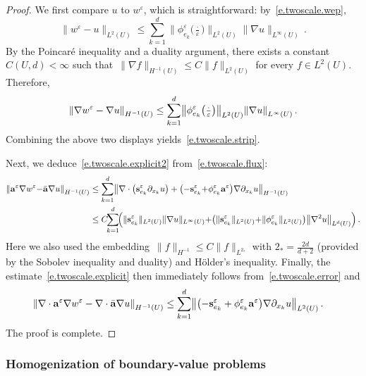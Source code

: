 \documentclass[11pt]{article} %
\numberwithin{equation}{section}
\theoremstyle{definition}
\let\originalleft\left
\let\originalright\right
\renewcommand{\left}{\mathopen{}\mathclose\bgroup\originalleft}
\renewcommand{\right}{\aftergroup\egroup\originalright}
\newcommand{\eps}{\varepsilon}
\newcommand{\s}{\mathbf{s}}
\newcommand{\ep}{\eps}
\renewcommand{\a}{\mathbf{a}}
\newcommand{\ahom}{\bar{\a}}
\begin{document}
\begin{proof}
We first compare $u$ to $w^\ep$, which is straightforward: by~\eqref{e.twoscale.wep}, 
\begin{equation*}
\| w^\ep - u  \|_{L^2(U)} 
\leq
\sum_{k=1}^d  
\| \phi_{e_k}^\ep\bigl( \tfrac \cdot \ep\bigr) \|_{L^2(U)}
\| \nabla u \|_{L^\infty(U)}
\,.
\end{equation*}
By the Poincar\'e inequality and a duality argument, there exists a constant~$C(U,d)<\infty$ such that~$\| \nabla f \|_{H^{-1}(U)} \leq C \| f  \|_{L^2(U)}$ for every $f\in L^2(U)$. Therefore,
\begin{equation*}
\left\| 
\nabla w^\ep - \nabla u \right\|_{H^{-1}(U)} 
\leq
\sum_{k=1}^d  
\left\| \phi_{e_k}^\ep\bigl( \tfrac \cdot \ep\bigr) \right\|_{L^2(U)}
\left\| \nabla u \right\|_{L^\infty(U)}
\,.
\end{equation*}
Combining the above two displays yields~\eqref{e.twoscale.strip}.

\smallskip

Next, we deduce~\eqref{e.twoscale.explicit2} from~\eqref{e.twoscale.flux}:
\begin{align*}
\left\| 
\a^\ep \nabla w^\ep {-} \ahom \nabla u \right\|_{H^{{-}1}(U)} 
&
\leq
\sum_{k=1}^d 
\bigl\| 
\nabla \cdot \left( \s^\ep_{e_k}  \partial_{x_k} u  \right)
+
\bigl( - \s^\ep_{e_k} {+} \phi_{e_k}^\ep \a^\ep \bigr) \nabla \partial_{x_k} u
\bigr\|_{H^{-1}(U)} 
\\  &
\leq
C \! \! \sum_{k=1}^d \!
\left( 
\| \s_{e_k}^\ep  \|_{L^2(U)} \| \nabla u \|_{L^{\infty}(U)}  
 {+} 
\bigl( 
\| \s_{e_k}^\ep  \|_{L^2(U)} {+} \| \phi_{e_k}^\ep  \|_{L^2(U)}
\bigr)  
\left\| \nabla^2 u \right\|_{L^{d}(U)}  
 \right) 
\,.
\end{align*}
Here we also used the embedding~$\| f \|_{H^{-1}} \leq C \| f \|_{L^{2_\ast}}$ with $2_\ast = \frac{2d}{d+2}$ (provided by the Sobolev inequality and duality) and H\"older's inequality.
Finally, the estimate~\eqref{e.twoscale.explicit} then immediately follows from~\eqref{e.twoscale.error} and
\begin{align*}
\left\|
\nabla \cdot \a^\ep \nabla w^\ep 
-
\nabla\cdot \ahom \nabla u
\right\|_{H^{-1}(U)} 
&
\leq
\sum_{k=1}^d 
\left\| 
\left(
- \s_{e_k}^\ep 
+
\phi_{e_k}^\ep \a^\ep 
\right) \nabla \partial_{x_k} u 
\right\|_{L^2(U)}
\, .
\end{align*}
The proof is complete. 
\end{proof}




\subsubsection{Homogenization of boundary-value problems}
\end{document}
